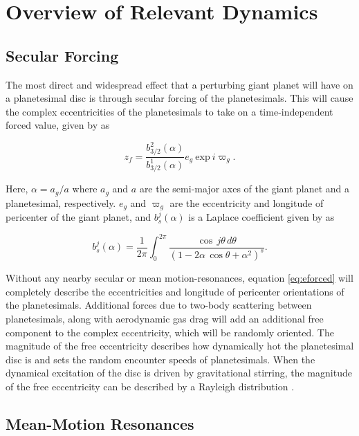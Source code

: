 \documentclass[fleqn,usenatbib]{mnras}
\begin{document}
\section{Overview of Relevant Dynamics} \label{sec:dynamics}

\subsection{Secular Forcing}\label{sec:sec_force}

The most direct and widespread effect that a perturbing giant planet will have on a planetesimal disc is through secular forcing of the planetesimals. This will 
cause the complex eccentricities of the planetesimals to take on a time-independent 
forced value, given by \citep{1999ApJ...527..918W} as

\begin{equation}\label{eq:eforced}
	z_{f} = \frac{b^{2}_{3/2} (\alpha)}{b^{1}_{3/2} (\alpha)} e_{g} ~ \mathrm{exp} ~ i \varpi_{g}.
\end{equation}

\noindent Here, $\alpha = a_{g} / a$ where $a_{g}$ and $a$ are the semi-major axes of the giant planet and a planetesimal, 
respectively. $e_{g}$ and $\varpi_{g}$ are the eccentricity and
longitude of pericenter of the giant planet, and $b^{j}_{s} (\alpha)$ is a 
Laplace coefficient given by \citep{1999ssd..book.....M} as

\begin{equation}\label{eq:lap}
	b_{s}^{j}(\alpha) = \frac{1}{2 \pi} \int_{0}^{2 \pi} \frac{\cos \, j \theta \, d \theta}{\left( 1 - 2 \alpha \, \cos \theta + \alpha^2 \right)^{s}}.
\end{equation}

Without any nearby secular or mean motion-resonances, equation \ref{eq:eforced} will completely describe the eccentricities and longitude of  
pericenter orientations of the planetesimals. Additional forces due to two-body scattering between planetesimals, along with 
aerodynamic gas drag will add an additional free component to the complex eccentricity, which will be randomly oriented. The 
magnitude of the free eccentricity describes how dynamically hot the planetesimal disc is and sets the random encounter speeds of 
planetesimals. When the dynamical excitation of the disc is driven by gravitational stirring, the magnitude of the free eccentricity can 
be described by a Rayleigh distribution \citep{1992Icar...96..107I}.

\subsection{Mean-Motion Resonances}
\end{document}
